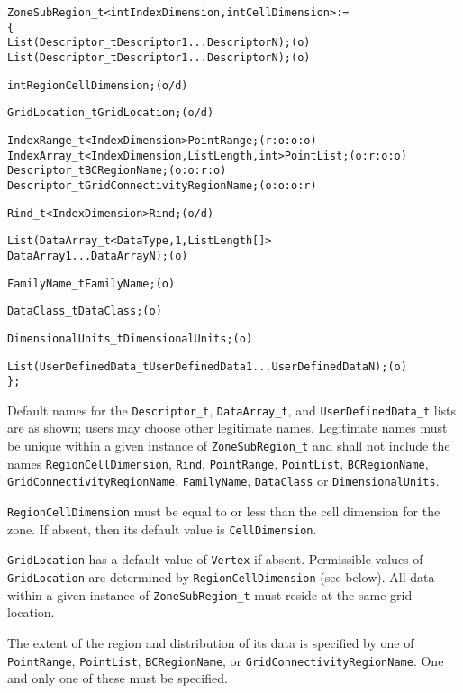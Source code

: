 \begin{alltt}
  ZoneSubRegion\_t< int IndexDimension, int CellDimension > :=
    \{
    List( Descriptor\_t Descriptor1 ... DescriptorN ) ;                      (o)
    List( Descriptor\_t Descriptor1 ... DescriptorN ) ;                      (o)

    int RegionCellDimension ;                                               (o/d)

    GridLocation\_t GridLocation ;                                           (o/d)

    IndexRange\_t<IndexDimension> PointRange ;                               (r:o:o:o)
    IndexArray\_t<IndexDimension, ListLength, int> PointList ;               (o:r:o:o)
    Descriptor\_t BCRegionName ;                                             (o:o:r:o)
    Descriptor\_t GridConnectivityRegionName ;                               (o:o:o:r)

    Rind\_t<IndexDimension> Rind;                                            (o/d)

    List( DataArray\_t<DataType, 1, ListLength[]> 
          DataArray1 ... DataArrayN ) ;                                     (o)

    FamilyName\_t FamilyName ;                                               (o)

    DataClass\_t DataClass ;                                                 (o)

    DimensionalUnits\_t DimensionalUnits ;                                   (o)

    List( UserDefinedData\_t UserDefinedData1 ... UserDefinedDataN ) ;       (o)
    \} ;
\end{alltt}

\begin{notes}
\item Default names for the
      \texttt{Descriptor\_t},
      \texttt{DataArray\_t}, and
      \texttt{UserDefinedData\_t}
      lists are as shown; users may choose other legitimate names.
      Legitimate names must be unique within a given instance of
      \texttt{ZoneSubRegion\_t} and shall not include the names
      \texttt{RegionCellDimension}, \texttt{Rind}, \texttt{PointRange},
      \texttt{PointList}, \texttt{BCRegionName}, \texttt{GridConnectivityRegionName},
      \texttt{FamilyName}, \texttt{DataClass} or \texttt{DimensionalUnits}.
\item \texttt{RegionCellDimension} must be equal to or less than the
      cell dimension for the zone. If absent, then its default value is
      \texttt{CellDimension}.
\item \texttt{GridLocation} has a default value of \texttt{Vertex} if absent.
      Permissible values of \texttt{GridLocation} are determined by
      \texttt{RegionCellDimension} (see below). All data within a given
      instance of \texttt{ZoneSubRegion\_t} must reside at the same grid location.
\item The extent of the region and distribution of its data is specified by one of
      \texttt{PointRange}, \texttt{PointList}, \texttt{BCRegionName}, or
      \texttt{GridConnectivityRegionName}. One and only one of these must be specified.
\end{notes}

